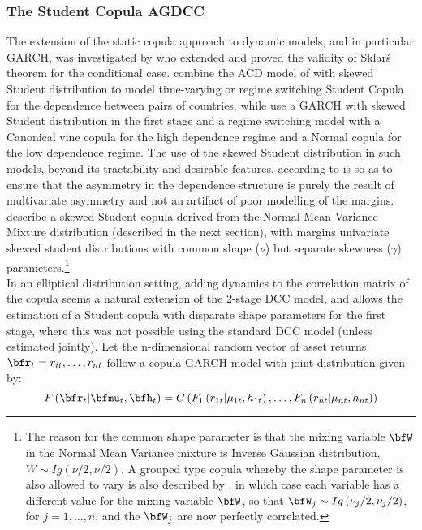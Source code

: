 \subsubsection{The Student Copula AGDCC}\label{II:agdcccopula}
The extension of the static copula approach to dynamic models, and in particular
GARCH, was investigated by \cite{Patton2006} who extended and proved the
validity of Sklar\'s theorem for the conditional case. \cite{Jondeau2006}
combine the ACD model of \cite{Hansen1994} with skewed Student distribution
to model time-varying or regime switching Student Copula for the dependence
between pairs of countries, while \cite{Chollete2009} use a GARCH with
skewed Student distribution in the first stage and a regime switching model
with a Canonical vine copula for the high dependence regime and a Normal copula
for the low dependence regime. The use of the skewed Student distribution in
such models, beyond its tractability and desirable features, according to
\cite{Chollete2009} is so as to ensure that the asymmetry in the
dependence structure is purely the result of multivariate asymmetry and not an
artifact of poor modelling of the margins. \cite{Demarta2005} describe a
skewed Student copula derived from the Normal Mean Variance Mixture distribution
(described in the next section), with margins univariate skewed student
distributions with common shape ($\nu$) but separate skewness ($\gamma$)
parameters.\footnote{The reason for the common shape parameter is that the
mixing variable $\bfW$ in the Normal Mean Variance mixture is Inverse Gaussian
distribution, $W\sim Ig\left( {\nu /2,\nu /2} \right)$. A grouped type copula
whereby the shape parameter is also allowed to vary is also described by
\cite{Demarta2005}, in which case each variable has a different value for
the mixing variable $\bfW$, so that $\bfW_j\sim Ig\left( {\nu_j /2,\nu_j /2} \right)$,
for $j=1,\dots,n$, and the $\bfW_j$ are now perfectly correlated.}\\
In an elliptical distribution setting, adding dynamics to the correlation matrix
of the copula seems a natural extension of the 2-stage DCC model, and allows the
estimation of a Student copula with disparate shape parameters for the first stage,
where this was not possible using the standard DCC model (unless estimated jointly).
Let the n-dimensional random vector of asset returns $\bfr_t={r_{it},\dots,r_{nt}}$
follow a copula GARCH model with joint distribution given by:
\begin{equation}\label{eq:copula11}
F\left( {{\bfr_t}|{\bfmu _t},{\bfh_t}} \right) = C\left( {{F_1}\left( {{r_{1t}}|{\mu _{1t}},{h_{1t}}} \right),\dots,{F_n}\left( {{r_{nt}}|{\mu_{nt}},{h_{nt}}} \right)} \right)
\end{equation}
